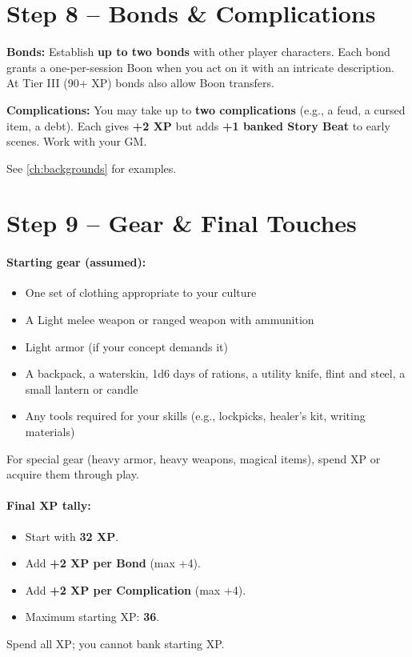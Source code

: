 \section{Step 8 -- Bonds \& Complications}
\label{sec:bonds-complications}
\textbf{Bonds:} Establish \textbf{up to two bonds} with other player characters. Each bond grants a one-per-session Boon when you act on it with an intricate description. At Tier III (90+ XP) bonds also allow Boon transfers.

\textbf{Complications:} You may take up to \textbf{two complications} (e.g., a feud, a cursed item, a debt). Each gives \textbf{+2 XP} but adds \textbf{+1 banked Story Beat} to early scenes. Work with your GM.

See \ref{ch:backgrounds} for examples.

\section{Step 9 -- Gear \& Final Touches}
\label{sec:starting-gear}
\paragraph{Starting gear (assumed):}
\begin{itemize}
  \item One set of clothing appropriate to your culture
  \item A Light melee weapon or ranged weapon with ammunition
  \item Light armor (if your concept demands it)
  \item A backpack, a waterskin, 1d6 days of rations, a utility knife, flint and steel, a small lantern or candle
  \item Any tools required for your skills (e.g., lockpicks, healer's kit, writing materials)
\end{itemize}
For special gear (heavy armor, heavy weapons, magical items), spend XP or acquire them through play.

\paragraph{Final XP tally:}
\begin{itemize}
  \item Start with \textbf{32 XP}.
  \item Add \textbf{+2 XP per Bond} (max +4).
  \item Add \textbf{+2 XP per Complication} (max +4).
  \item Maximum starting XP: \textbf{36}.
\end{itemize}
Spend all XP; you cannot bank starting XP.

